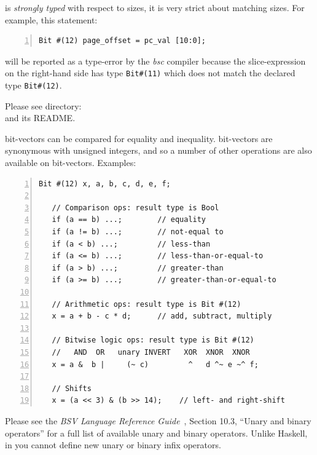 {\BSV} is \emph{strongly typed} with respect to sizes, {\ie} it is very
strict about matching sizes.  For example, this statement:

{\footnotesize
\begin{Verbatim}[frame=single, numbers=left]
   Bit #(12) page_offset = pc_val [10:0];
\end{Verbatim}
}

will be reported as a type-error by the \emph{bsc} compiler because
the slice-expression on the right-hand side has type \verb|Bit#(11)|
which does not match the declared type \verb|Bit#(12)|.

\Beginexercise

Please see directory:  \\
and its README.
\Endexercise

{\BSV} bit-vectors can be compared for equality and inequality.  {\BSV}
bit-vectors are synonymous with unsigned integers, and so a number of
other operations are also available on bit-vectors.  Examples:


{\footnotesize
\begin{Verbatim}[frame=single, numbers=left]
   Bit #(12) x, a, b, c, d, e, f;

   // Comparison ops: result type is Bool
   if (a == b) ...;        // equality
   if (a != b) ...;        // not-equal to
   if (a < b) ...;         // less-than
   if (a <= b) ...;        // less-than-or-equal-to
   if (a > b) ...;         // greater-than
   if (a >= b) ...;        // greater-than-or-equal-to

   // Arithmetic ops: result type is Bit #(12)
   x = a + b - c * d;      // add, subtract, multiply

   // Bitwise logic ops: result type is Bit #(12)
   //   AND  OR   unary INVERT   XOR  XNOR  XNOR
   x = a &  b |     (~ c)         ^   d ^~ e ~^ f;

   // Shifts
   x = (a << 3) & (b >> 14);    // left- and right-shift
\end{Verbatim}
}

Please see the \emph{BSV Language Reference Guide}~\cite{BLang2000},
Section 10.3, ``Unary and binary operators'' for a full list of
available unary and binary operators.  Unlike Haskell, in {\BSV} you
cannot define new unary or binary infix operators.

